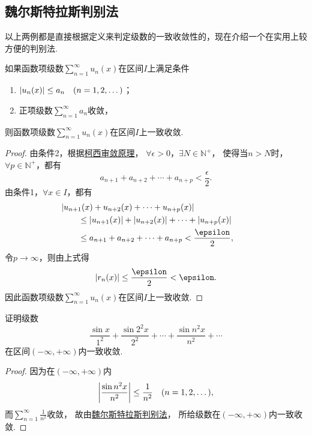 \subsection{魏尔斯特拉斯判别法}
以上两例都是直接根据定义来判定级数的一致收敛性的，现在介绍一个在实用上较方便的判别法.
\begin{theorem}[魏尔斯特拉斯判别法]\label{theorem:无穷级数.魏尔斯特拉斯判别法}
如果函数项级数\(\sum\limits_{n=1}^\infty u_n(x)\)在区间\(I\)上满足条件\begin{enumerate}
\item \(\abs{u_n(x)} \leq a_n \quad(n=1,2,\dotsc)\)；
\item 正项级数\(\sum\limits_{n=1}^\infty a_n\)收敛，
\end{enumerate}
则函数项级数\(\sum\limits_{n=1}^\infty u_n(x)\)在区间\(I\)上一致收敛.
\begin{proof}
由条件2，根据\hyperref[theorem:无穷级数.级数的柯西审敛原理]{柯西审敛原理}，
\(\forall\epsilon>0\)，\(\exists N \in \mathbb{N}^+\)，
使得当\(n > N\)时，\(\forall p \in \mathbb{N}^+\)，都有\[
a_{n+1} + a_{n+2} + \dotsb + a_{n+p} < \frac{\epsilon}{2}.
\]由条件1，\(\forall x \in I\)，都有\begin{align*}
&\hspace{-20pt}\abs{u_{n+1}(x) + u_{n+2}(x) + \dotsb + u_{n+p}(x)} \\
&\leq \abs{u_{n+1}(x)} + \abs{u_{n+2}(x)} + \dotsb + \abs{u_{n+p}(x)} \\
&\leq a_{n+1} + a_{n+2} + \dotsb + a_{n+p} < \frac{\epsilon}{2},
\end{align*}令\(p\to\infty\)，则由上式得\[
\abs{r_n(x)} \leq \frac{\epsilon}{2} < \epsilon.
\]因此函数项级数\(\sum\limits_{n=1}^\infty u_n(x)\)在区间\(I\)上一致收敛.
\end{proof}
\end{theorem}

\begin{example}
证明级数\[
\frac{\sin x}{1^2}
+ \frac{\sin 2^2 x}{2^2}
+ \dotsb
+ \frac{\sin n^2 x}{n^2}
+ \dotsb
\]在区间\((-\infty,+\infty)\)内一致收敛.
\begin{proof}
因为在\((-\infty,+\infty)\)内\[
\abs{\frac{\sin n^2 x}{n^2}} \leq \frac{1}{n^2}
\quad(n=1,2,\dotsc),
\]而\(\sum\limits_{n=1}^\infty \frac{1}{n^2}\)收敛，
故由\hyperref[theorem:无穷级数.魏尔斯特拉斯判别法]{魏尔斯特拉斯判别法}，
所给级数在\((-\infty,+\infty)\)内一致收敛.
\end{proof}
\end{example}

